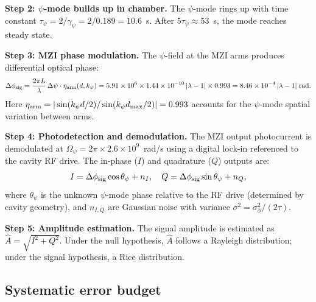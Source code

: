\documentclass[11pt]{article}
\newcommand{\ee}[1]{\times 10^{#1}}
\newcommand{\lam}{\lambda}
\newcommand{\Opsi}{\Omega_\psi}
\newcommand{\gpsi}{\gamma_\psi}
\begin{document}
\textbf{Step 2: $\psi$-mode builds up in chamber.}
The $\psi$-mode rings up with time constant
$\tau_\psi = 2/\gpsi = 2/0.189 = 10.6$~s. After $5\tau_\psi
\approx 53$~s, the mode reaches steady state.

\textbf{Step 3: MZI phase modulation.}
The $\psi$-field at the MZI arms produces differential optical
phase:
\begin{equation}
\Delta\phi_{\rm sig} = \frac{2\pi L}{\lambda}\,\Delta\psi
\cdot \eta_{\rm arm}(d, k_\psi)
= 5.91\ee{6} \times 1.44\ee{-10}\,|\lam-1| \times 0.993
= 8.46\ee{-4}\,|\lam-1|\;\text{rad}.
\label{eq:signal-phase}
\end{equation}
Here $\eta_{\rm arm} = |\sin(k_\psi d/2)/\sin(k_\psi d_{\rm max}/2)|
= 0.993$ accounts for the $\psi$-mode spatial variation between arms.

\textbf{Step 4: Photodetection and demodulation.}
The MZI output photocurrent is demodulated at $\Opsi = 2\pi
\times 2.6\ee{9}$~rad/s using a digital lock-in referenced to
the cavity RF drive. The in-phase ($I$) and quadrature ($Q$)
outputs are:
\begin{equation}
I = \Delta\phi_{\rm sig}\cos\theta_\psi + n_I, \quad
Q = \Delta\phi_{\rm sig}\sin\theta_\psi + n_Q,
\end{equation}
where $\theta_\psi$ is the unknown $\psi$-mode phase relative to
the RF drive (determined by cavity geometry), and $n_{I,Q}$ are
Gaussian noise with variance $\sigma^2 = \sigma_\phi^2/(2\tau)$.

\textbf{Step 5: Amplitude estimation.}
The signal amplitude is estimated as $\hat{A} = \sqrt{I^2 + Q^2}$.
Under the null hypothesis, $\hat{A}$ follows a Rayleigh distribution;
under the signal hypothesis, a Rice distribution.

\subsection{Systematic error budget}
\end{document}
